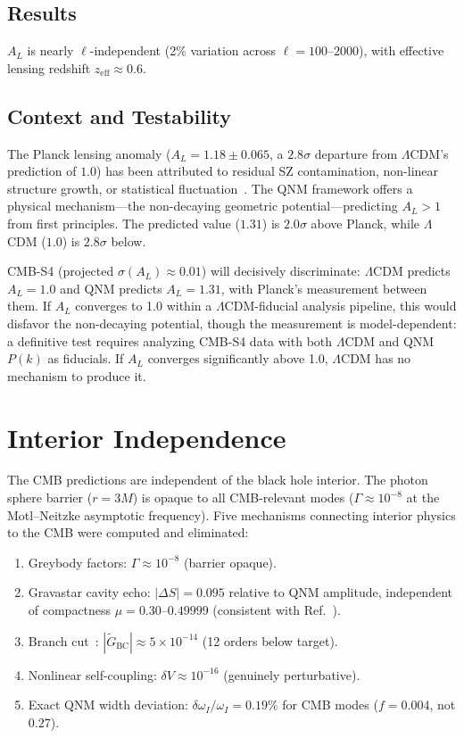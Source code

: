 \documentclass[aps,prd,twocolumn,superscriptaddress,showpacs,preprintnumbers,amsmath,amssymb,nofootinbib]{revtex4-2}
\newcommand{\lcdm}{$\Lambda$CDM}
\begin{document}
\subsection{Results}

$A_L$ is nearly $\ell$-independent (2\% variation across $\ell = 100$--$2000$), with effective lensing redshift $z_\mathrm{eff} \approx 0.6$.

\subsection{Context and Testability}

The Planck lensing anomaly ($A_L = 1.18 \pm 0.065$, a $2.8\sigma$ departure from \lcdm's prediction of $1.0$) has been attributed to residual SZ contamination, non-linear structure growth, or statistical fluctuation~\cite{Planck2020,DiValentino2020,MotlochHu2020}. The QNM framework offers a physical mechanism---the non-decaying geometric potential---predicting $A_L > 1$ from first principles. The predicted value ($1.31$) is $2.0\sigma$ above Planck, while \lcdm{} ($1.0$) is $2.8\sigma$ below.

CMB-S4 (projected $\sigma(A_L) \approx 0.01$) will decisively discriminate: \lcdm{} predicts $A_L = 1.0$ and QNM predicts $A_L = 1.31$, with Planck's measurement between them. If $A_L$ converges to 1.0 within a \lcdm-fiducial analysis pipeline, this would disfavor the non-decaying potential, though the measurement is model-dependent: a definitive test requires analyzing CMB-S4 data with both \lcdm{} and QNM $P(k)$ as fiducials. If $A_L$ converges significantly above 1.0, \lcdm{} has no mechanism to produce it.


\section{Interior Independence}
\label{sec:interior}

The CMB predictions are independent of the black hole interior. The photon sphere barrier ($r = 3M$) is opaque to all CMB-relevant modes ($\Gamma \approx 10^{-8}$ at the Motl--Neitzke asymptotic frequency). Five mechanisms connecting interior physics to the CMB were computed and eliminated:

\begin{enumerate}
\item Greybody factors: $\Gamma \approx 10^{-8}$ (barrier opaque).
\item Gravastar cavity echo: $|\Delta S| = 0.095$ relative to QNM amplitude, independent of compactness $\mu = 0.30$--$0.49999$ (consistent with Ref.~\cite{ChirentiRezzolla2007}).
\item Branch cut~\cite{Leaver1986}: $|\tilde{G}_\mathrm{BC}| \approx 5 \times 10^{-14}$ (12 orders below target).
\item Nonlinear self-coupling: $\delta V \approx 10^{-16}$ (genuinely perturbative).
\item Exact QNM width deviation: $\delta\omega_I/\omega_I = 0.19\%$ for CMB modes ($f = 0.004$, not $0.27$).
\end{enumerate}
\end{document}
